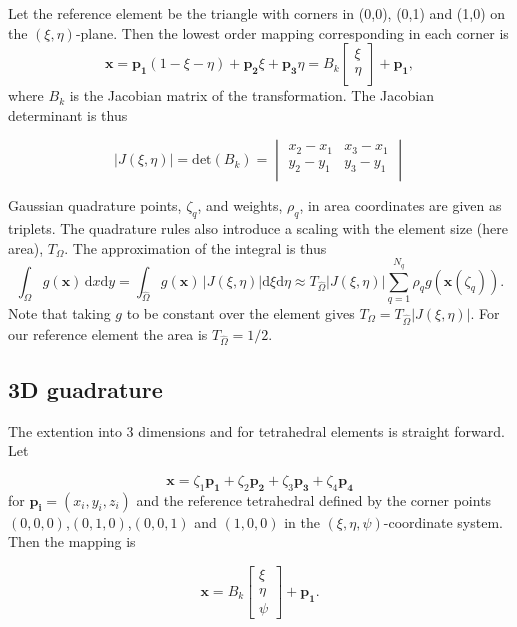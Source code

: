 \documentclass[paper=a4, fontsize=11pt]{scrartcl} %
\begin{document}
Let the reference element be the triangle with corners in (0,0), (0,1) and (1,0) on the $(\xi,\eta)$-plane. Then the lowest order mapping corresponding in each corner is
\[ \mathbf{x}= \mathbf{p_1}(1-\xi-\eta) +\mathbf{p_2}\xi +\mathbf{p_3}\eta = B_k\left[ \begin{array}{c} \xi\\ \eta\\ \end{array} \right] + \mathbf{p_1},
\]
where $B_k$ is the Jacobian matrix of the transformation. The Jacobian determinant is thus

\begin{equation}
|J(\xi,\eta)| = \mathrm{det}(B_k) = \begin{vmatrix}
  x_2-x_1 & x_3-x_1 \\
  y_2-y_1 & y_3-y_1 \\
\end{vmatrix}  
  \label{equation:jacobian2d}
\end{equation}

Gaussian quadrature points, $\zeta_q$, and weights, $\rho_q$, in area coordinates are given as triplets. The quadrature rules also introduce a scaling with the element size (here area), $T_\Omega$. The approximation of the integral is thus
\[ \int_{\Omega} \! g(\mathbf{x}) \, \mathrm{d}x\mathrm{d}y = \int_{\hat{\Omega}} \! g(\mathbf{x}) \, |J(\xi,\eta)| \mathrm{d}\xi \mathrm{d}\eta \approx T_{\hat{\Omega}} |J(\xi,\eta)| \sum_{q=1}^{N_q} \rho_{q}g(\mathbf{x}(\zeta_q)).
\]
Note that taking $g$ to be constant over the element gives $T_{\Omega}=T_{\hat{\Omega}} |J(\xi,\eta)|$. For our reference element the area is $T_{\hat{\Omega}}=1/2$.

\subsection{3D guadrature}
The extention into 3 dimensions and for tetrahedral elements is straight forward. Let

\[ \mathbf{x} = \zeta_1\mathbf{p_1} +\zeta_2\mathbf{p_2} +\zeta_3\mathbf{p_3} + \zeta_4\mathbf{p_4} 
\]
for $\mathbf{p_i} =(x_i,y_i,z_i)$ and the reference tetrahedral defined by the corner points $(0,0,0)$,$(0,1,0)$,$(0,0,1)$ and $(1,0,0)$ in the $(\xi,\eta,\psi)$-coordinate system. Then the mapping is

\[ \mathbf{x}= B_k\left[ \begin{array}{c} \xi\\ \eta\\ \psi \end{array} \right] + \mathbf{p_1}.
\]
\end{document}
